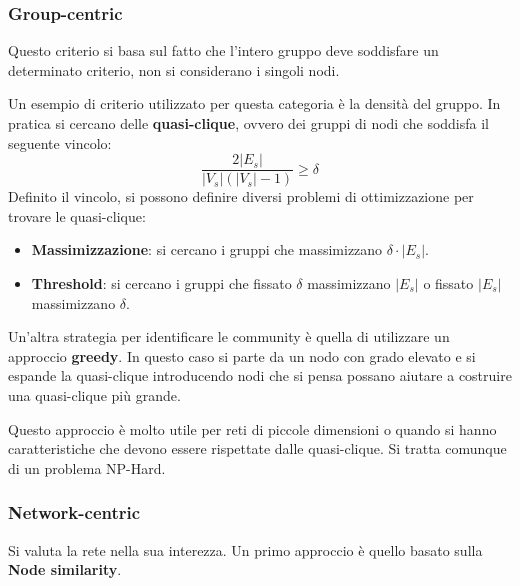 \subsubsection{Group-centric}
Questo criterio si basa sul fatto che l'intero gruppo deve soddisfare un determinato
criterio, non si considerano i singoli nodi.

Un esempio di criterio utilizzato per questa categoria è la densità del gruppo.
In pratica si cercano delle \textbf{quasi-clique}, ovvero dei gruppi di nodi
che soddisfa il seguente vincolo:
\begin{equation}
    \frac{2 |E_s|}{|V_s|(|V_s| - 1)} \geq \delta
\end{equation}
Definito il vincolo, si possono definire diversi problemi di ottimizzazione per
trovare le quasi-clique:
\begin{itemize}
    \item \textbf{Massimizzazione}: si cercano i gruppi che massimizzano $\delta\cdot |E_s|$.
    \item \textbf{Threshold}: si cercano i gruppi che fissato $\delta$ massimizzano $|E_s|$ o fissato $|E_s|$ massimizzano $\delta$.
\end{itemize}
Un'altra strategia per identificare le community è quella di utilizzare un approccio
\textbf{greedy}. In questo caso si parte da un nodo con grado elevato e si espande
la quasi-clique introducendo nodi che si pensa possano aiutare a costruire una
quasi-clique più grande.

Questo approccio è molto utile per reti di piccole dimensioni o quando si hanno
caratteristiche che devono essere rispettate dalle quasi-clique. Si tratta comunque
di un problema NP-Hard.
\subsubsection{Network-centric}
Si valuta la rete nella sua interezza. Un primo approccio è quello basato sulla
\textbf{Node similarity}.
